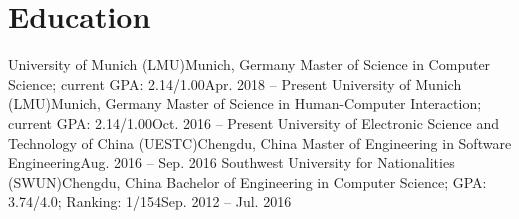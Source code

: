 \section{\textbf{Education}}
  \resumeSubHeadingListStart
    \resumeSubheading
      {University of Munich (LMU)}{Munich, Germany}
      {Master of Science in Computer Science; current GPA: 2.14/1.00}{Apr. 2018 -- Present}
    \resumeSubheading
      {University of Munich (LMU)}{Munich, Germany}
      {Master of Science in Human-Computer Interaction; current GPA: 2.14/1.00}{Oct. 2016 -- Present}
    \resumeSubheading
      {University of Electronic Science and Technology of China (UESTC)}{Chengdu, China}
      {Master of Engineering in Software Engineering}{Aug. 2016 -- Sep. 2016}
    \resumeSubheading
      {Southwest University for Nationalities (SWUN)}{Chengdu, China}
      {Bachelor of Engineering in Computer Science;  GPA: 3.74/4.0; Ranking: 1/154}{Sep. 2012 -- Jul. 2016}
  \resumeSubHeadingListEnd